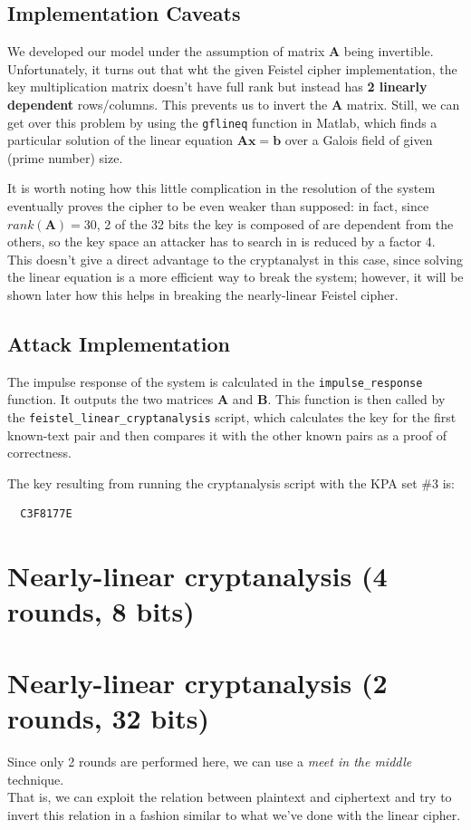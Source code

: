 \documentclass[a4paper,12pt,titlepage]{article}
\begin{document}
\subsection*{Implementation Caveats}
We developed our model under the assumption of matrix $\mathbf{A}$
being invertible. Unfortunately, it turns out that wht the given Feistel cipher
implementation, the key multiplication matrix doesn't have full rank but
instead has \textbf{2 linearly dependent} rows/columns. This prevents us to invert
the $\mathbf{A}$ matrix. Still, we can get over this problem by using
the \texttt{gflineq} function in Matlab, which finds a particular solution of the
linear equation $\mathbf{A}\mathbf{x} = \mathbf{b}$ over a Galois field of
given (prime number) size.

It is worth noting how this little complication in the resolution of the
system eventually proves the cipher to be even weaker than supposed: in fact,
since $rank(\mathbf{A}) = 30$, 2 of the 32 bits the key is composed
of are dependent from the others, so the key space an attacker has to search in is
reduced by a factor 4. This doesn't give a direct advantage to the cryptanalyst
in this case, since solving the linear equation is a more efficient way to
break the system; however, it will be shown later how this helps in breaking
the nearly-linear Feistel cipher.

\subsection*{Attack Implementation}
The impulse response of the system is calculated in the \texttt{impulse\_response}
function. It outputs the two matrices $\mathbf{A}$ and
$\mathbf{B}$. This function is then called by the
\texttt{feistel\_linear\_cryptanalysis} script, which calculates the key for the first
known-text pair and then compares it with the other known pairs as a proof of
correctness.

The key resulting from running the cryptanalysis script with the KPA set \#3 is:

\begin{verbatim}
  C3F8177E
\end{verbatim}

\section{Nearly-linear cryptanalysis (4 rounds, 8 bits)}
\section{Nearly-linear cryptanalysis (2 rounds, 32 bits)}
Since only 2 rounds are performed here, we can use a \emph{meet in the middle}
technique. \\
That is, we can exploit the relation between plaintext and ciphertext and try
to invert this relation in a fashion similar to what we've done with the linear
cipher.
\end{document}

